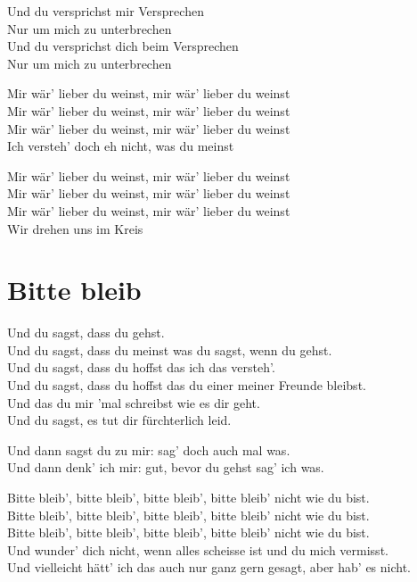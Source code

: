 \documentclass[]{book}
\begin{document}
Und du versprichst mir Versprechen\\
Nur um mich zu unterbrechen\\
Und du versprichst dich beim Versprechen\\
Nur um mich zu unterbrechen

Mir wär' lieber du weinst, mir wär' lieber du weinst\\
Mir wär' lieber du weinst, mir wär' lieber du weinst\\
Mir wär' lieber du weinst, mir wär' lieber du weinst\\
Ich versteh' doch eh nicht, was du meinst

Mir wär' lieber du weinst, mir wär' lieber du weinst\\
Mir wär' lieber du weinst, mir wär' lieber du weinst\\
Mir wär' lieber du weinst, mir wär' lieber du weinst\\
Wir drehen uns im Kreis

\hypertarget{bitte-bleib}{%
\section{Bitte bleib}\label{bitte-bleib}}

Und du sagst, dass du gehst.\\
Und du sagst, dass du meinst was du sagst, wenn du gehst.\\
Und du sagst, dass du hoffst das ich das versteh'.\\
Und du sagst, dass du hoffst das du einer meiner Freunde bleibst.\\
Und das du mir 'mal schreibst wie es dir geht.\\
Und du sagst, es tut dir fürchterlich leid.

Und dann sagst du zu mir: sag' doch auch mal was.\\
Und dann denk' ich mir: gut, bevor du gehst sag' ich was.

Bitte bleib', bitte bleib', bitte bleib', bitte bleib' nicht wie du bist.\\
Bitte bleib', bitte bleib', bitte bleib', bitte bleib' nicht wie du bist.\\
Bitte bleib', bitte bleib', bitte bleib', bitte bleib' nicht wie du bist.\\
Und wunder' dich nicht, wenn alles scheisse ist und du mich vermisst.\\
Und vielleicht hätt' ich das auch nur ganz gern gesagt, aber hab' es nicht.
\end{document}
